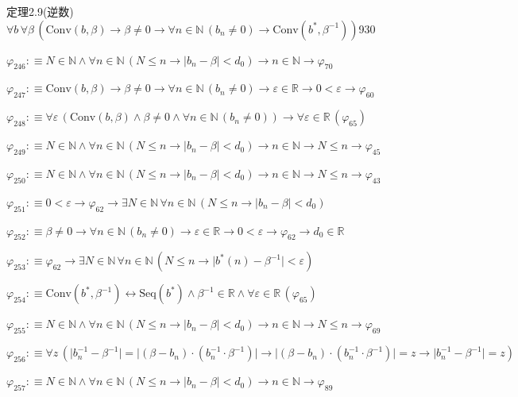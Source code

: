 \begin{fullproof}{定理2.9(逆数)}{$\forall b\,\forall \beta\,(\mathrm{Conv}(b,\beta) \to \beta \neq 0 \to \forall n \in \mathbb{N}\,(b_{n} \neq 0) \to \mathrm{Conv}(b^{\ast},\beta^{-1}))$}{930}
\begin{abbrevlist}
\item $\varphi_{246} :\equiv N \in \mathbb{N} \land \forall n \in \mathbb{N}\,(N \leq n \to \lvert b_{n} - \beta \rvert < d_{0}) \to n \in \mathbb{N} \to \varphi_{70}$
\item $\varphi_{247} :\equiv \mathrm{Conv}(b,\beta) \to \beta \neq 0 \to \forall n \in \mathbb{N}\,(b_{n} \neq 0) \to \varepsilon \in \mathbb{R} \to 0 < \varepsilon \to \varphi_{60}$
\item $\varphi_{248} :\equiv \forall \varepsilon\,(\mathrm{Conv}(b,\beta) \land \beta \neq 0 \land \forall n \in \mathbb{N}\,(b_{n} \neq 0)) \to \forall \varepsilon \in \mathbb{R}\,(\varphi_{65})$
\item $\varphi_{249} :\equiv N \in \mathbb{N} \land \forall n \in \mathbb{N}\,(N \leq n \to \lvert b_{n} - \beta \rvert < d_{0}) \to n \in \mathbb{N} \to N \leq n \to \varphi_{45}$
\item $\varphi_{250} :\equiv N \in \mathbb{N} \land \forall n \in \mathbb{N}\,(N \leq n \to \lvert b_{n} - \beta \rvert < d_{0}) \to n \in \mathbb{N} \to N \leq n \to \varphi_{43}$
\item $\varphi_{251} :\equiv 0 < \varepsilon \to \varphi_{62} \to \exists N \in \mathbb{N}\,\forall n \in \mathbb{N}\,(N \leq n \to \lvert b_{n} - \beta \rvert < d_{0})$
\item $\varphi_{252} :\equiv \beta \neq 0 \to \forall n \in \mathbb{N}\,(b_{n} \neq 0) \to \varepsilon \in \mathbb{R} \to 0 < \varepsilon \to \varphi_{62} \to d_{0} \in \mathbb{R}$
\item $\varphi_{253} :\equiv \varphi_{62} \to \exists N \in \mathbb{N}\,\forall n \in \mathbb{N}\,(N \leq n \to \lvert b^{\ast}(n) - \beta^{-1} \rvert < \varepsilon)$
\item $\varphi_{254} :\equiv \mathrm{Conv}(b^{\ast},\beta^{-1}) \leftrightarrow \mathrm{Seq}(b^{\ast}) \land \beta^{-1} \in \mathbb{R} \land \forall \varepsilon \in \mathbb{R}\,(\varphi_{65})$
\item $\varphi_{255} :\equiv N \in \mathbb{N} \land \forall n \in \mathbb{N}\,(N \leq n \to \lvert b_{n} - \beta \rvert < d_{0}) \to n \in \mathbb{N} \to N \leq n \to \varphi_{69}$
\item $\varphi_{256} :\equiv \forall z\,(\lvert b_{n}^{-1} - \beta^{-1} \rvert = \lvert (\beta - b_{n}) \cdot (b_{n}^{-1} \cdot \beta^{-1}) \rvert \to \lvert (\beta - b_{n}) \cdot (b_{n}^{-1} \cdot \beta^{-1}) \rvert = z \to \lvert b_{n}^{-1} - \beta^{-1} \rvert = z)$
\item $\varphi_{257} :\equiv N \in \mathbb{N} \land \forall n \in \mathbb{N}\,(N \leq n \to \lvert b_{n} - \beta \rvert < d_{0}) \to n \in \mathbb{N} \to \varphi_{89}$

\end{abbrevlist}
\end{fullproof}
